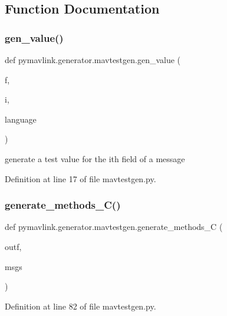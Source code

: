 \subsection{Function Documentation}
\mbox{\label{namespacepymavlink_1_1generator_1_1mavtestgen_ab5f7ec934669efadef3e9665c35a4866}} 
\subsubsection{\texorpdfstring{gen\_value()}{gen\_value()}}
{\footnotesize\ttfamily def pymavlink.\+generator.\+mavtestgen.\+gen\+\_\+value (\begin{DoxyParamCaption}\item[{}]{f,  }\item[{}]{i,  }\item[{}]{language }\end{DoxyParamCaption})}

\begin{DoxyVerb}generate a test value for the ith field of a message\end{DoxyVerb}
 

Definition at line 17 of file mavtestgen.\+py.

\mbox{\label{namespacepymavlink_1_1generator_1_1mavtestgen_aea36216fc3d20f573590548aeee1a08f}} 
\subsubsection{\texorpdfstring{generate\_methods\_C()}{generate\_methods\_C()}}
{\footnotesize\ttfamily def pymavlink.\+generator.\+mavtestgen.\+generate\+\_\+methods\+\_\+C (\begin{DoxyParamCaption}\item[{}]{outf,  }\item[{}]{msgs }\end{DoxyParamCaption})}



Definition at line 82 of file mavtestgen.\+py.

